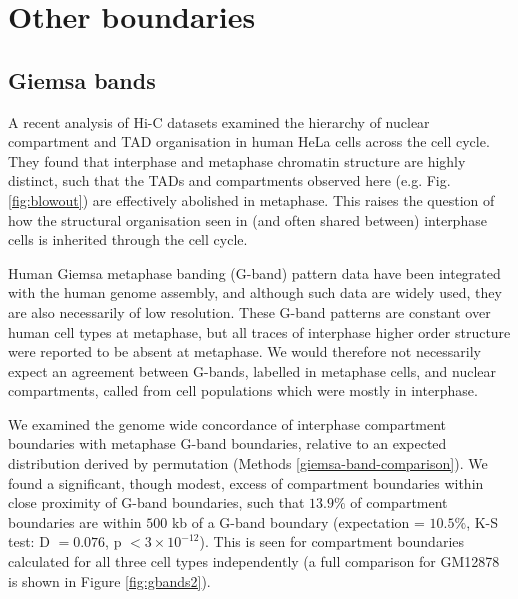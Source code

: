 \documentclass[a4paper,11pt,oneside]{book}
\begin{document}
\section{Other boundaries}

\subsection{Giemsa bands}

A recent analysis of Hi-C datasets examined the hierarchy of nuclear compartment and TAD organisation in human HeLa cells across the cell cycle. They found that interphase and metaphase chromatin structure are highly distinct, such that the TADs and compartments observed here (e.g. Fig. \ref{fig:blowout}) are effectively abolished in metaphase.\cite{Naumova2013} This raises the question of how the structural organisation seen in (and often shared between) interphase cells is inherited through the cell cycle.

Human Giemsa metaphase banding (G-band) pattern data have been integrated with the human genome assembly, and although such data are widely used, they are also necessarily of low resolution.\cite{Furey2003} These G-band patterns are constant over human cell types at metaphase, but all traces of interphase higher order structure were reported to be absent at metaphase.\cite{Naumova2013} We would therefore not necessarily expect an agreement between G-bands, labelled in metaphase cells, and nuclear compartments, called from cell populations which were mostly in interphase. 

We examined the genome wide concordance of interphase compartment boundaries with metaphase G-band boundaries, relative to an expected distribution derived by permutation (Methods \ref{giemsa-band-comparison}). We found a significant, though modest, excess of compartment boundaries within close proximity of G-band boundaries, such that $13.9\%$ of compartment boundaries are within $500$ kb of a G-band boundary (expectation = $10.5\%$, K-S test: D $= 0.076$, p $< 3 \times10^{-12}$). This is seen for compartment boundaries calculated for all three cell types independently (a full comparison for GM12878 is shown in Figure \ref{fig:gbands2}). 
\end{document}
